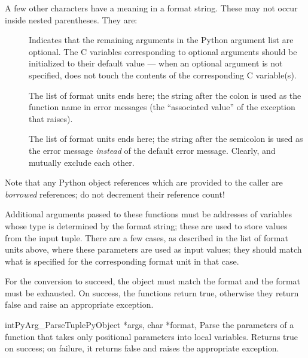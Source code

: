 A few other characters have a meaning in a format string.  These may
not occur inside nested parentheses.  They are:

\begin{description}
  \item[\samp{|}]
  Indicates that the remaining arguments in the Python argument list
  are optional.  The C variables corresponding to optional arguments
  should be initialized to their default value --- when an optional
  argument is not specified,  does not
  touch the contents of the corresponding C variable(s).

  \item[\samp{:}]
  The list of format units ends here; the string after the colon is
  used as the function name in error messages (the ``associated
  value'' of the exception that 
  raises).

  \item[\samp{;}]
  The list of format units ends here; the string after the semicolon
  is used as the error message \emph{instead} of the default error
  message.  Clearly, \samp{:} and \samp{;} mutually exclude each
  other.
\end{description}

Note that any Python object references which are provided to the
caller are \emph{borrowed} references; do not decrement their
reference count!

Additional arguments passed to these functions must be addresses of
variables whose type is determined by the format string; these are
used to store values from the input tuple.  There are a few cases, as
described in the list of format units above, where these parameters
are used as input values; they should match what is specified for the
corresponding format unit in that case.

For the conversion to succeed, the  object must match the
format and the format must be exhausted.  On success, the
 functions return true, otherwise they
return false and raise an appropriate exception.

\begin{cfuncdesc}{int}{PyArg_ParseTuple}{PyObject *args, char *format,
                                         \moreargs}
  Parse the parameters of a function that takes only positional
  parameters into local variables.  Returns true on success; on
  failure, it returns false and raises the appropriate exception.
\end{cfuncdesc}

